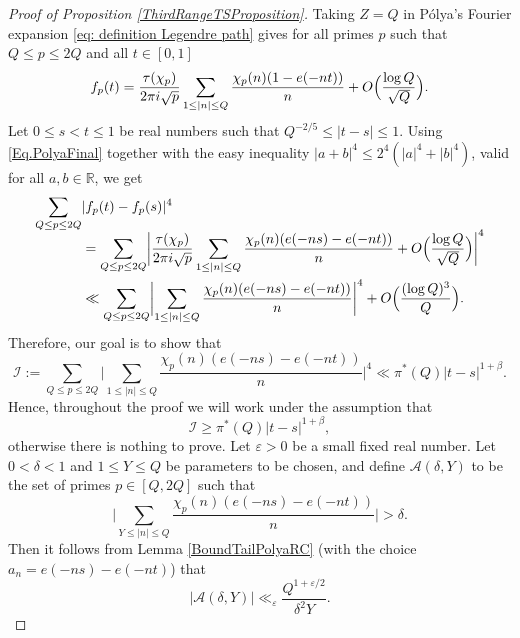\documentclass[10pt]{amsart}
\theoremstyle{plain}
\theoremstyle{definition}
\let\ep\varepsilon
\begin{document}
\begin{proof}[Proof of Proposition \ref{ThirdRangeTSProposition}]
Taking $Z=Q$ in Pólya's Fourier expansion \eqref{eq: definition Legendre path} gives for all primes $p$ such that $Q\leq p\leq 2Q$ and all $t\in [0, 1]$\vspace*{-3pt}
\begin{equation}\label{Eq.PolyaFinal}
f_p(t)= \frac{\tau(\chi_p)}{2\pi i\sqrt{p}}\sum_{1\leq |n|\leq Q} \frac{\chi_p(n) (1-e(-nt))}{n} +O\Bigl(\frac{\log Q}{\sqrt{Q}}\Bigr).
\end{equation}
Let $0\leq s<t\leq 1$ be real numbers such that $Q^{-2/5}\leq |t-s|\leq 1$. Using \eqref{Eq.PolyaFinal} together with the easy inequality $|a+b|^{4} \leq 2^{4}(|a|^{4}+|b|^{4})$, valid for all $a, b\in \mathbb{R}$, we get\vspace*{-3pt}
\begin{equation}
\begin{aligned}\label{InequalityI}
\sum_{Q\leq p\leq 2Q}& |f_p(t)-f_p(s)|^4\\[-5pt]
&= \sum_{Q\leq p\leq 2Q} \biggl|\frac{\tau(\chi_p)}{2\pi i\sqrt{p}}\sum_{1\leq |n|\leq Q} \frac{\chi_p(n) (e(-ns)-e(-nt))}{n} +O\Bigl(\frac{\log Q}{\sqrt{Q}}\Bigr)\biggr|^4\\
&\ll \sum_{Q\leq p\leq 2Q} \biggl|\sum_{1\leq |n|\leq Q} \frac{\chi_p(n) (e(-ns)-e(-nt))}{n} \biggr|^4+ O\Bigl(\frac{(\log Q)^3}{Q}\Bigr).
\end{aligned}
\end{equation}
Therefore, our goal is to show that\vspace*{-3pt}
\[
\mathcal{I}:= \sum_{Q\leq p\leq 2Q} \biggl|\sum_{1\leq |n|\leq Q} \frac{\chi_p(n) (e(-ns)-e(-nt))}{n} \biggr|^4\ll \pi^*(Q) |t-s|^{1+\beta}.\] Hence, throughout the proof we will work under the assumption that\vspace*{-3pt}
\begin{equation}\label{Eq.AssumptionI}
\mathcal{I}\geq \pi^*(Q) |t-s|^{1+\beta},
\end{equation} otherwise there is nothing to prove.
Let $\ep>0$ be a small fixed real number. Let $0<\delta<1$ and $1\leq Y\leq Q$ be parameters to be chosen, and define $\mathcal{A}(\delta, Y)$ to be the set of primes $p\in [Q, 2Q]$ such that\vspace*{-3pt}
\[
\biggl|\sum_{Y\leq |n|\leq Q} \frac{\chi_p(n) (e(-ns)-e(-nt))}{n}\biggr| >\delta.\]
Then it follows from Lemma \ref{BoundTailPolyaRC} (with the choice $a_n=e(-ns)-e(-nt)$)
that\vspace*{-3pt}
\begin{equation}\label{ConsequenceLemma4.5}
|\mathcal{A}(\delta, Y)|\ll_{\ep} \frac{Q^{1+\ep/2}}{\delta^2 Y}.

\end{equation}
\end{proof}
\end{document}
